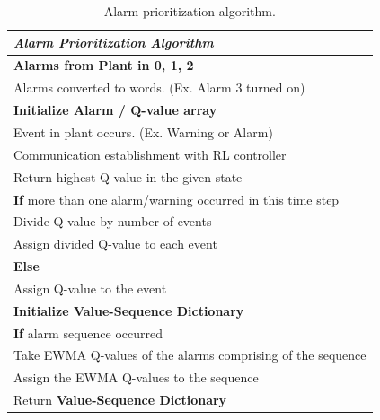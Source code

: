 \begin{table}
    {
    \centering
	\begin{tabular}{p{13cm}}
	\hline
	\emph{Alarm Prioritization Algorithm} \\
	\hline
	\textbf{Alarms from Plant in 0, 1, 2} \\
	\hspace{0.5cm} Alarms converted to words. (Ex. Alarm 3 turned on)\\
	\textbf{Initialize Alarm / Q-value array} \\
	\hspace{0.5cm} Event in plant occurs. (Ex. Warning or Alarm) \\
	\hspace{0.5cm} Communication establishment with RL controller \\
	\hspace{1cm} Return highest Q-value in the given state \\
	\hspace{1cm} \textbf{If} more than one alarm/warning occurred in this time step \\
	\hspace{1.5cm} Divide Q-value by number of events \\
	\hspace{1.5cm} Assign divided Q-value to each event \\
	\hspace{1cm} \textbf{Else} \\
	\hspace{1.5cm} Assign Q-value to the event \\
	\textbf{Initialize Value-Sequence Dictionary} \\
	\hspace{0.5cm}\textbf{If} alarm sequence occurred \\
	\hspace{1cm} Take EWMA Q-values of the alarms comprising of the sequence \\
	\hspace{1cm} Assign the EWMA Q-values to the sequence \\
	\hspace{0.5cm} Return \textbf{Value-Sequence Dictionary} \\
	\hline
	\end{tabular}}
	\caption{Alarm prioritization algorithm.}
	\label{alg:03alarmprioritization}
\end{table}


